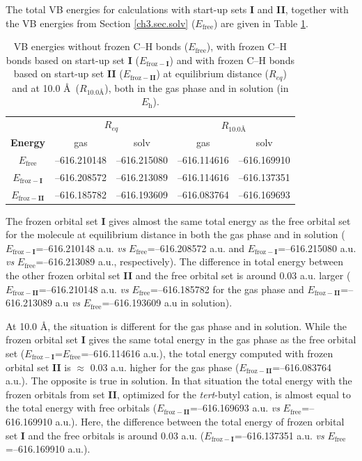 The total VB energies for calculations with start-up sets \textbf{I} and \textbf{II}, together with the VB energies from Section \ref{ch3.sec.solv} ($E_\mathrm{free}$) are given in Table \ref{ch3.tab.frozen}. 
\begin{table}[htp]
\center
\caption{VB energies without frozen C--H bonds ($E_\mathrm{free}$), with frozen C--H bonds based on
start-up set \textbf{I} ($E_\mathrm{froz-\textbf{I}}$) and with frozen C--H bonds based on start-up set \textbf{II}
($E_\mathrm{froz-\textbf{II}}$) at equilibrium distance ($R_{eq}$) and at 10.0 \AA\ ($R_{10.0 \text{\AA}}$),
both in the gas phase and in solution (in $E_\mathrm{h}$).}
\center
\begin{tabular}{|c|cc|cc|}
\hline
&\multicolumn{2}{c|}{$R_{eq}$}&\multicolumn{2}{c|}{$R_{10.0 \text{\AA}}$} \\
\textbf{Energy} & gas & solv & gas & solv \\
\hline
$E_\mathrm{free}$ & {--616.210148} & {--616.215080} & {--616.114616} & {--616.169910} \\
$E_\mathrm{froz-\textbf{I}}$& {--616.208572} & {--616.213089} & {--616.114616} & {--616.137351} \\
$E_\mathrm{froz-\textbf{II}}$& {--616.185782} & {--616.193609} & {--616.083764} & {--616.169693} \\
\hline
\end{tabular}
\label{ch3.tab.frozen}
\end{table}

The frozen orbital set \textbf{I} gives almost the same total energy as the free orbital set for the molecule at equilibrium distance in both the gas phase and in solution ($E_{\mathrm{froz}-\textbf{I}}$=--616.210148 a.u. \textit{vs} $E_\mathrm{free}$=--616.208572 a.u. and $E_{\mathrm{froz}-\textbf{I}}$=--616.215080 a.u. \textit{vs} $E_\mathrm{free}$=--616.213089 a.u., respectively). The difference in total energy between the other frozen orbital set \textbf{II} and the free orbital set is around 0.03 a.u. larger ($E_{\mathrm{froz}-\textbf{II}}$=--616.210148 a.u. \textit{vs} $E_\mathrm{free}$=--616.185782 for the gas phase and $E_{\mathrm{froz}-\textbf{II}}$=--616.213089 a.u \textit{vs} $E_\mathrm{free}$=--616.193609 a.u in solution).

At 10.0 \AA, the situation is different for the gas phase and in solution. While the frozen orbital set \textbf{I} gives the same total energy in the gas phase as the free orbital set ($E_{\mathrm{froz}-\textbf{I}}$=$E_\mathrm{free}$=--616.114616 a.u.), the total energy computed with frozen orbital set \textbf{II} is $\approx$ 0.03 a.u. higher for the gas phase ($E_{\mathrm{froz}-\textbf{II}}$=--616.083764 a.u.). The opposite is true in solution. In that situation the total energy with the frozen orbitals from set \textbf{II}, optimized for the \textit{tert}-butyl cation, is almost equal to the total energy with free orbitals ($E_{\mathrm{froz}-\textbf{II}}$=--616.169693 a.u. \textit{vs} $E_\mathrm{free}$=--616.169910 a.u.). Here, the difference between the total energy of frozen orbital set \textbf{I} and the free orbitals is around 0.03 a.u. ($E_{\mathrm{froz}-\textbf{I}}$=--616.137351 a.u. \textit{vs} $E_\mathrm{free}$=--616.169910 a.u.).

